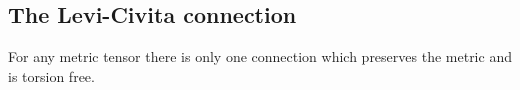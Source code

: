 
\subsection{The Levi-Civita connection}

For any metric tensor there is only one connection which preserves the metric and is torsion free.

